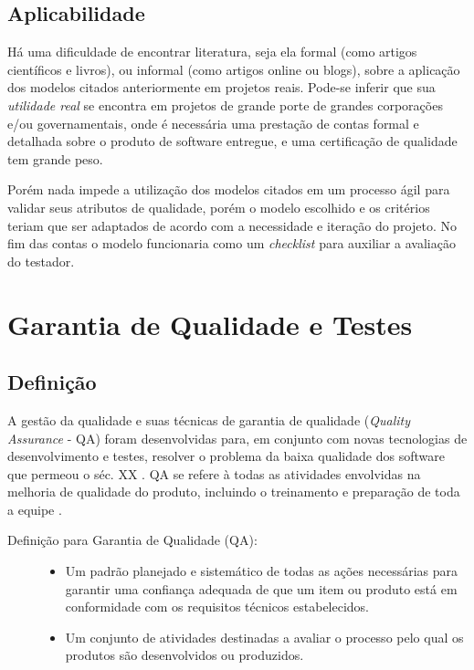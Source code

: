 \documentclass[
	12pt,				%
	openright,			%
	oneside,			%
	a4paper,			%
	english,			%
	brazil,				%
	]{abntex2}
\begin{document}
\section{Aplicabilidade}
Há uma dificuldade de encontrar literatura, seja ela formal (como artigos científicos e livros), ou informal (como artigos online ou blogs), sobre a aplicação dos modelos citados anteriormente em projetos reais. Pode-se inferir que sua \emph{utilidade real} se encontra em projetos de grande porte de grandes corporações e/ou governamentais, onde é necessária uma prestação de contas formal e detalhada sobre o produto de software entregue, e uma certificação de qualidade tem grande peso.

Porém nada impede a utilização dos modelos citados em um processo ágil para validar seus atributos de qualidade, porém o modelo escolhido e os critérios teriam que ser adaptados de acordo com a necessidade e iteração do projeto. No fim das contas o modelo funcionaria como um \emph{checklist} para auxiliar a avaliação do testador.

\chapter{Garantia de Qualidade e Testes}

\section{Definição}
A gestão da qualidade e suas técnicas de garantia de qualidade (\emph{Quality Assurance} - QA) foram desenvolvidas para, em conjunto com novas tecnologias de desenvolvimento e testes, resolver o problema da baixa qualidade dos software que permeou o séc. XX \cite{SOMMERVILLE2011}. QA se refere à todas as atividades envolvidas na melhoria de qualidade do produto, incluindo o treinamento e preparação de toda a equipe \cite{tsui2013}.

\begin{description}
    \item[Definição  para Garantia de Qualidade (QA):] \hfill
        \begin{itemize}
            \item Um padrão planejado e sistemático de todas as ações necessárias para garantir uma confiança adequada de que um item ou produto está em conformidade com os requisitos técnicos estabelecidos.
            \item Um conjunto de atividades destinadas a avaliar o processo pelo qual os produtos são desenvolvidos ou produzidos.
        \end{itemize}
\end{description}
\end{document}
